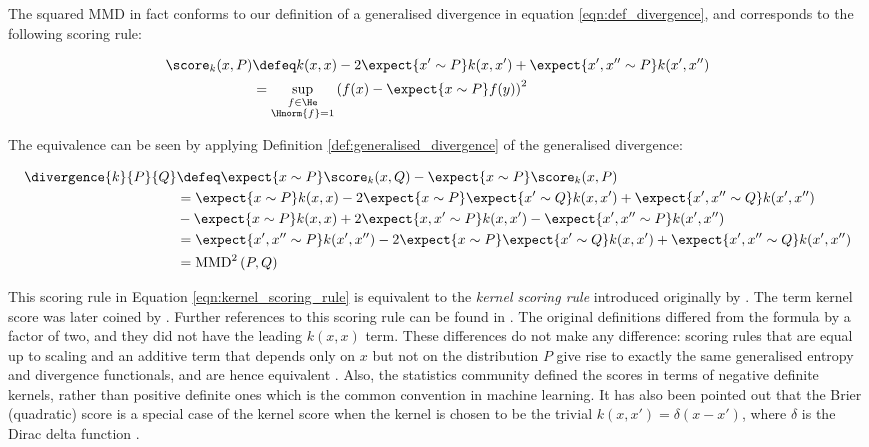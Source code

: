 The squared MMD in fact conforms to our definition of a generalised divergence in equation \eqref{eqn:def_divergence}, and corresponds to the following scoring rule:

\begin{align}
	\score_{k}(x,P) &\defeq k(x,x) - 2 \expect{x'\sim P} k(x,x') + \expect{x',x''\sim P}k(x',x'') \label{eqn:kernel_scoring_rule}\\
		&=  \sup_{\substack{f\in\He\\\Hnorm{f}=1}}\left( f(x)- \expect{x\sim P} f(y) \right)^2
\end{align}

The equivalence can be seen by applying Definition \ref{def:generalised_divergence} of the generalised divergence:

\begin{align}
	\divergence{k}{P}{Q} &\defeq \expect{x\sim P} \score_{k}(x,Q) - \expect{x\sim P} \score_{k}(x,P)\\
		&= \expect{x\sim P} k(x,x) - 2 \expect{x\sim P}\expect{x'\sim Q} k(x,x') + \expect{x',x''\sim Q}k(x',x'')\\
		&- \expect{x\sim P} k(x,x) + 2 \expect{x,x'\sim P} k(x,x') - \expect{x',x''\sim P}k(x',x'') \\
		&= \expect{x',x''\sim P}k(x',x'') - 2 \expect{x\sim P}\expect{x'\sim Q} k(x,x') + \expect{x',x''\sim Q}k(x',x'')\\
		&= \mbox{MMD}^2\left(P,Q\right)
\end{align}

This scoring rule in Equation \eqref{eqn:kernel_scoring_rule} is equivalent to the \emph{kernel scoring rule} introduced originally by \citet{Eaton1982}. The term kernel score was later coined by \citet{Dawid2007}. Further references to this scoring rule can be found in \citep{Eaton1996,Gneiting2007}. The original definitions differed from the formula by a factor of two, and they did not have the leading $k(x,x)$ term. These differences do not make any difference: scoring rules that are equal up to scaling and an additive term that depends only on $x$ but not on the distribution $P$ give rise to exactly the same generalised entropy and divergence functionals, and are hence equivalent \citep{Dawid2007}. Also, the statistics community defined the scores in terms of negative definite kernels, rather than positive definite ones which is the common convention in machine learning. It has also been pointed out that the Brier (quadratic) score is a special case of the kernel score when the kernel is chosen to be the trivial $k(x,x') = \delta(x - x')$, where $\delta$ is the Dirac delta function \citep{Dawid2007}.

